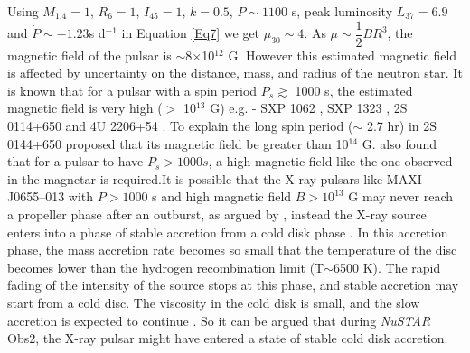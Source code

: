 \documentclass[12pt,a4paper,fleqn,usenatbib]{mnras}
\begin{document}
Using $M_{1.4}=1$, $R_{6}=1$, $I_{45}=1$, $k=0.5$, $P\sim1100$ s, peak luminosity $L_{37}=6.9$ and $\dot{P}\sim-1.23$\;s d$^{-1}$ in Equation \ref{Eq7} we get $\mu_{30}\sim4$. As $\mu\sim\dfrac{1}{2}BR^{3}$, the magnetic field of the pulsar is $\sim$8$\times$10$^{12}$ G. However this estimated magnetic field is affected by uncertainty on the distance, mass, and radius of the neutron star. It is known that for a pulsar with a spin period $P_{s} \gtrsim$ 1000 s, the estimated magnetic field is very high ($>$ 10$^{13}$ G) e.g. - SXP 1062 \citep{2012ApJ...757..171F}, SXP 1323 \citep{2022A&A...661A..33M}, 2S 0114+650 \citep{1999ApJ...513L..45L} and 4U 2206+54 \citep{Reig2012}. To explain the long spin period ($\sim$ 2.7 hr) in 2S 0144+650 \cite{1999ApJ...513L..45L} proposed that its magnetic field be greater than 10$^{14}$ G. \cite{Reig2012} also found that for a pulsar to have $P_{s} > 1000 s$, a high magnetic field like the one observed in the magnetar is required.It is possible that the X-ray pulsars like MAXI J0655--013 with $P>1000$ s and high magnetic field $B>10^{13}$ G may never reach a propeller phase after an outburst, as argued by \cite{2022A&A...661A..33M}, instead the X-ray source enters into a phase of stable accretion from a cold disk phase \citep{2017A&A...608A..17T}. In this accretion phase, the mass accretion rate becomes so small that the temperature of the disc becomes lower than the hydrogen recombination limit (T$\sim$6500 K). The rapid fading of the intensity of the source stops at this phase, and stable accretion may start from a cold disc. The viscosity in the cold disk is small, and the slow accretion is expected to continue \citep{2017A&A...608A..17T}. So it can be argued that during \emph{NuSTAR} Obs2, the X-ray pulsar might have entered a state of stable cold disk accretion. 
\end{document}
